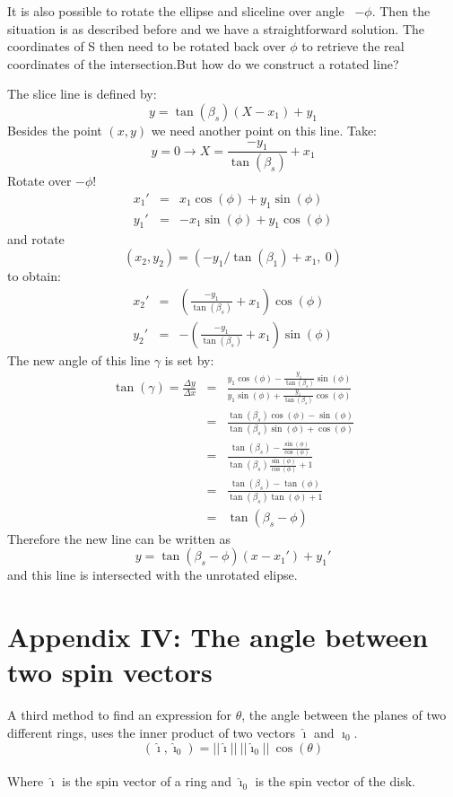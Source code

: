 \documentclass[11pt,a4paper]{article}
\newcommand{\sinb}[1]{\sin \left( #1 \right)}
\newcommand{\cosb}[1]{\cos \left( #1 \right)}
\newcommand{\tanb}[1]{\tan \left( #1 \right)}
\begin{document}
It is also possible to rotate the ellipse and sliceline over angle
\ $-\phi$. Then the situation is as described before and we have a
straightforward solution. The coordinates of S then need to be
rotated back over $\phi$ to retrieve the real coordinates of the
intersection.But how do we construct a rotated line?

The slice line is defined by:
$$y=\tanb{\beta_s}\left(X-x_1\right)+y_1$$
Besides the point $\left(x,y\right)$ we need another point on this
line. Take:
$$y=0 \rightarrow X = \frac{-y_1}{\tanb{\beta_s}} + x_1 $$
Rotate over $-\phi$!
\begin{eqnarray}
x_1' &=& x_1\cosb{\phi}+y_1\sinb{\phi}\nonumber\\
y_1' &=& -x_1\sinb{\phi}+y_1\cosb{\phi}
\end{eqnarray}
and rotate 
$$(x_2,y_2) = (-y_1/\tanb{\beta_1}+x_1,\ 0)$$
to obtain:
\begin{eqnarray}
x_2' &=& \left(\frac{-y_1}{\tanb{\beta_s}}+x_1\right)\cosb{\phi}\nonumber\\
y_2' &=& -\left(\frac{-y_1}{\tanb{\beta_s}}+x_1\right)\sinb{\phi}
\end{eqnarray}
The new angle of this line $\gamma$ is set by:
\begin{eqnarray*}
\tanb{\gamma} = 
\frac{\Delta y}{\Delta x} & = & 
\frac{y_{1}\cosb{\phi}-
		\frac{y_{1}}{\tanb{\beta_{s}}}
	\sinb{\phi}}
     {y_{1}\sinb{\phi}+
		\frac{y_1}{\tanb{\beta_{s}}}
	\cosb{\phi}}
\\ & = & 
\frac{\tanb{\beta_{s}}\cosb{\phi}-\sinb{\phi}}
     {\tanb{\beta_{s}}\sinb{\phi}+\cosb{\phi}}
\\ & = & 
\frac{\tanb{\beta_{s}}-
		\frac{\sinb{\phi}}{\cosb{\phi}}
	}
      {\tanb{\beta_{s}}
		\frac{\sinb{\phi}}{\cosb{\phi}}
	+1}
\\ & = & 
\frac{\tanb{\beta_{s}}-\tanb{\phi}}
      {\tanb{\beta_{s}}\tanb{\phi}+1}
\\ & = & 
\tanb{\beta_{s}-\phi}
\end{eqnarray*}
Therefore the new line can be written as
\begin{equation}
y=\tanb{\beta_{s}-\phi}\left(x-x_{1}'\right)+y_{1}'
\end{equation}
and this line is intersected with the unrotated elipse.
\pagebreak



\section*{Appendix IV: The angle between two spin vectors} 
A third method to find an expression for $\theta$, the angle between the planes of two different rings,
uses the inner product of two vectors $\hat \imath$ and $\hat \imath_0$.
\begin{equation}
(\hat \imath, \hat \imath_0) = ||\hat \imath||\   ||\hat \imath_0||\ \cosb{\theta}
\end{equation}\\
Where $\hat \imath$ is the spin vector of a ring and $\hat \imath_0$ is the spin vector of the disk.\\
\end{document}
